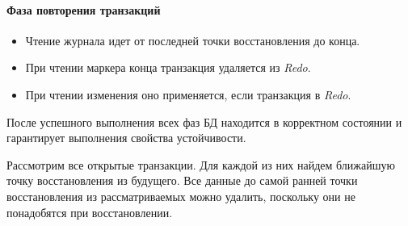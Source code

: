 \paragraph{Фаза повторения транзакций}

\begin{itemize}
    \item Чтение журнала идет от последней точки восстановления до конца.
    \item При чтении маркера конца транзакция удаляется из \textit{Redo}.
    \item При чтении изменения оно применяется, если транзакция в \textit{Redo}.
\end{itemize}

\begin{proposition}
    После успешного выполнения всех фаз БД находится в корректном состоянии и
    гарантирует выполнения свойства устойчивости.
\end{proposition}

\begin{proposition}
    Рассмотрим все открытые транзакции. Для каждой из них найдем ближайшую
    точку восстановления из будущего. Все данные до самой ранней точки
    восстановления из рассматриваемых можно удалить, поскольку они не
    понадобятся при восстановлении.
\end{proposition}
